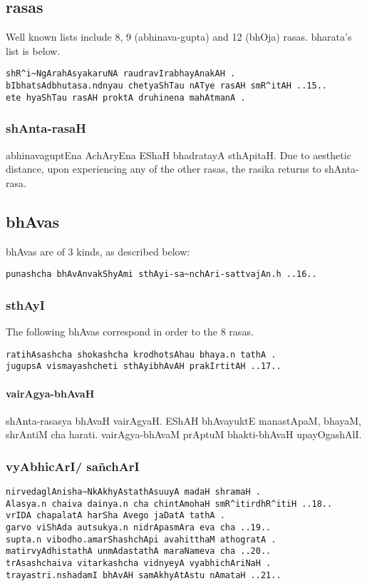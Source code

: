 \documentclass[oneside, article]{memoir}
\begin{document}
\subsection{rasas}
Well known lists include 8, 9 (abhinava-gupta) and 12 (bhOja) rasas. bharata's list is below.

\begin{verbatim}
shR^i~NgArahAsyakaruNA raudravIrabhayAnakAH .
bIbhatsAdbhutasa.ndnyau chetyaShTau nATye rasAH smR^itAH ..15..
ete hyaShTau rasAH proktA druhinena mahAtmanA .
\end{verbatim}

\subsubsection{shAnta-rasaH}
abhinavaguptEna AchAryEna EShaH bhadratayA sthApitaH. Due to aesthetic distance, upon experiencing any of the other rasas, the rasika returns to shAnta-rasa.

\subsection{bhAvas}
bhAvas are of 3 kinds, as described below:
\begin{verbatim}
punashcha bhAvAnvakShyAmi sthAyi-sa~nchAri-sattvajAn.h ..16..
\end{verbatim}

\subsubsection{sthAyI}
The following bhAvas correspond in order to the 8 rasas.
\begin{verbatim}
ratihAsashcha shokashcha krodhotsAhau bhaya.n tathA .
jugupsA vismayashcheti sthAyibhAvAH prakIrtitAH ..17..
\end{verbatim}

\paragraph{vairAgya-bhAvaH}
shAnta-rasasya bhAvaH vairAgyaH. EShAH bhAvayuktE manastApaM, bhayaM, shrAntiM cha harati. vairAgya-bhAvaM prAptuM bhakti-bhAvaH upayOgashAlI.

\subsubsection{vyAbhicArI/ sa\~nchArI}
\begin{verbatim}
nirvedaglAnisha~NkAkhyAstathAsuuyA madaH shramaH .
Alasya.n chaiva dainya.n cha chintAmohaH smR^itirdhR^itiH ..18..
vrIDA chapalatA harSha Avego jaDatA tathA .
garvo viShAda autsukya.n nidrApasmAra eva cha ..19..
supta.n vibodho.amarShashchApi avahitthaM athogratA .
matirvyAdhistathA unmAdastathA maraNameva cha ..20..
trAsashchaiva vitarkashcha vidnyeyA vyabhichAriNaH .
trayastri.nshadamI bhAvAH samAkhyAtAstu nAmataH ..21..
\end{verbatim}
\end{document}
